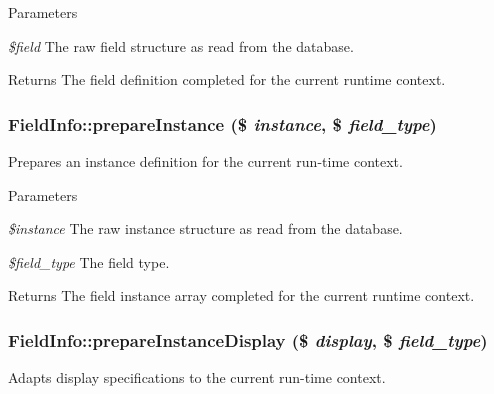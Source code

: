 \begin{DoxyParams}{Parameters}
\item[{\em \$field}]The raw field structure as read from the database.\end{DoxyParams}
\begin{DoxyReturn}{Returns}
The field definition completed for the current runtime context. 
\end{DoxyReturn}
\hypertarget{classFieldInfo_a1880ecc9614a0af5d46110a20f799ac7}{
\subsubsection[{prepareInstance}]{\setlength{\rightskip}{0pt plus 5cm}FieldInfo::prepareInstance (\$ {\em instance}, \/  \$ {\em field\_\-type})}}
\label{classFieldInfo_a1880ecc9614a0af5d46110a20f799ac7}
Prepares an instance definition for the current run-\/time context.


\begin{DoxyParams}{Parameters}
\item[{\em \$instance}]The raw instance structure as read from the database. \item[{\em \$field\_\-type}]The field type.\end{DoxyParams}
\begin{DoxyReturn}{Returns}
The field instance array completed for the current runtime context. 
\end{DoxyReturn}
\hypertarget{classFieldInfo_a79100b16f20d8bc081e4108da2e714b6}{
\subsubsection[{prepareInstanceDisplay}]{\setlength{\rightskip}{0pt plus 5cm}FieldInfo::prepareInstanceDisplay (\$ {\em display}, \/  \$ {\em field\_\-type})}}
\label{classFieldInfo_a79100b16f20d8bc081e4108da2e714b6}
Adapts display specifications to the current run-\/time context.


